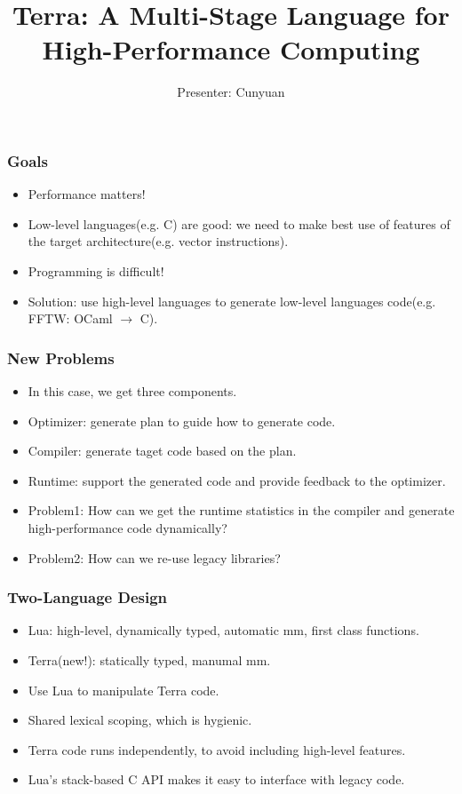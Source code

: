 \documentclass{beamer}
\begin{document}
\title{Terra: A Multi-Stage Language for High-Performance Computing}
\author{Presenter: Cunyuan}

\maketitle

\begin{frame}
	\frametitle{Goals}
  \begin{itemize}
  \item Performance matters!\pause
  \item Low-level languages(e.g. C) are good: we need to make best use of features of the target architecture(e.g. vector instructions).\pause
  \item Programming is difficult!\pause
  \item Solution: use high-level languages to generate low-level languages code(e.g. FFTW: OCaml $\rightarrow$ C).
  \end{itemize}
\end{frame}

\begin{frame}
	\frametitle{New Problems}
  \begin{itemize}
  \item In this case, we get three components.\pause
  \item Optimizer: generate plan to guide how to generate code.\pause
  \item Compiler: generate taget code based on the plan.\pause
  \item Runtime: support the generated code and provide feedback to the optimizer.\pause
  \item Problem1: How can we get the runtime statistics in the compiler and generate high-performance code dynamically?\pause
  \item Problem2: How can we re-use legacy libraries?
  \end{itemize}
\end{frame}

\begin{frame}
  \frametitle{Two-Language Design}
  \begin{itemize}
  \item Lua: high-level, dynamically typed, automatic mm, first class functions.\pause
  \item Terra(new!): statically typed, manumal mm.\pause
  \item Use Lua to manipulate Terra code.\pause
  \item Shared lexical scoping, which is hygienic.\pause
  \item Terra code runs independently, to avoid including high-level features.\pause
  \item Lua's stack-based C API makes it easy to interface with legacy code.
  \end{itemize}
\end{frame}
\end{document}
